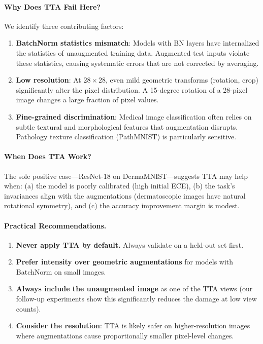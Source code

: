 \documentclass{article}
\theoremstyle{plain}
\theoremstyle{definition}
\theoremstyle{remark}
\begin{document}
\paragraph{Why Does TTA Fail Here?}
We identify three contributing factors:
\begin{enumerate}
    \item \textbf{BatchNorm statistics mismatch}: Models with BN layers have internalized the statistics of unaugmented training data. Augmented test inputs violate these statistics, causing systematic errors that are not corrected by averaging.
    \item \textbf{Low resolution}: At $28 \times 28$, even mild geometric transforms (rotation, crop) significantly alter the pixel distribution. A 15-degree rotation of a 28-pixel image changes a large fraction of pixel values.
    \item \textbf{Fine-grained discrimination}: Medical image classification often relies on subtle textural and morphological features that augmentation disrupts. Pathology texture classification (PathMNIST) is particularly sensitive.
\end{enumerate}

\paragraph{When Does TTA Work?}
The sole positive case---ResNet-18 on DermaMNIST---suggests TTA may help when: (a) the model is poorly calibrated (high initial ECE), (b) the task's invariances align with the augmentations (dermatoscopic images have natural rotational symmetry), and (c) the accuracy improvement margin is modest.

\paragraph{Practical Recommendations.}
\begin{enumerate}
    \item \textbf{Never apply TTA by default.} Always validate on a held-out set first.
    \item \textbf{Prefer intensity over geometric augmentations} for models with BatchNorm on small images.
    \item \textbf{Always include the unaugmented image} as one of the TTA views (our follow-up experiments show this significantly reduces the damage at low view counts).
    \item \textbf{Consider the resolution}: TTA is likely safer on higher-resolution images where augmentations cause proportionally smaller pixel-level changes.
\end{enumerate}
\end{document}
